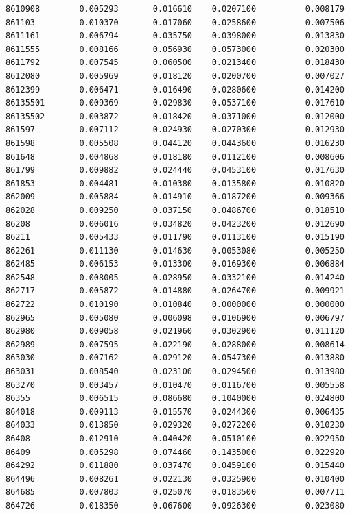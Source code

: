 \documentclass[
  letterpaper,
  DIV=11,
  numbers=noendperiod]{scrartcl}
\begin{document}
\begin{verbatim}
8610908        0.005293       0.016610    0.0207100          0.008179
861103         0.010370       0.017060    0.0258600          0.007506
8611161        0.006794       0.035750    0.0398000          0.013830
8611555        0.008166       0.056930    0.0573000          0.020300
8611792        0.007545       0.060500    0.0213400          0.018430
8612080        0.005969       0.018120    0.0200700          0.007027
8612399        0.006471       0.016490    0.0280600          0.014200
86135501       0.009369       0.029830    0.0537100          0.017610
86135502       0.003872       0.018420    0.0371000          0.012000
861597         0.007112       0.024930    0.0270300          0.012930
861598         0.005508       0.044120    0.0443600          0.016230
861648         0.004868       0.018180    0.0112100          0.008606
861799         0.009882       0.024440    0.0453100          0.017630
861853         0.004481       0.010380    0.0135800          0.010820
862009         0.005884       0.014910    0.0187200          0.009366
862028         0.009250       0.037150    0.0486700          0.018510
86208          0.006016       0.034820    0.0423200          0.012690
86211          0.005433       0.011790    0.0113100          0.015190
862261         0.011130       0.014630    0.0053080          0.005250
862485         0.006153       0.013300    0.0169300          0.006884
862548         0.008005       0.028950    0.0332100          0.014240
862717         0.005872       0.014880    0.0264700          0.009921
862722         0.010190       0.010840    0.0000000          0.000000
862965         0.005080       0.006098    0.0106900          0.006797
862980         0.009058       0.021960    0.0302900          0.011120
862989         0.007595       0.022190    0.0288000          0.008614
863030         0.007162       0.029120    0.0547300          0.013880
863031         0.008540       0.023100    0.0294500          0.013980
863270         0.003457       0.010470    0.0116700          0.005558
86355          0.006515       0.086680    0.1040000          0.024800
864018         0.009113       0.015570    0.0244300          0.006435
864033         0.013850       0.029320    0.0272200          0.010230
86408          0.012910       0.040420    0.0510100          0.022950
86409          0.005298       0.074460    0.1435000          0.022920
864292         0.011880       0.037470    0.0459100          0.015440
864496         0.008261       0.022130    0.0325900          0.010400
864685         0.007803       0.025070    0.0183500          0.007711
864726         0.018350       0.067600    0.0926300          0.023080

\end{verbatim}
\end{document}
